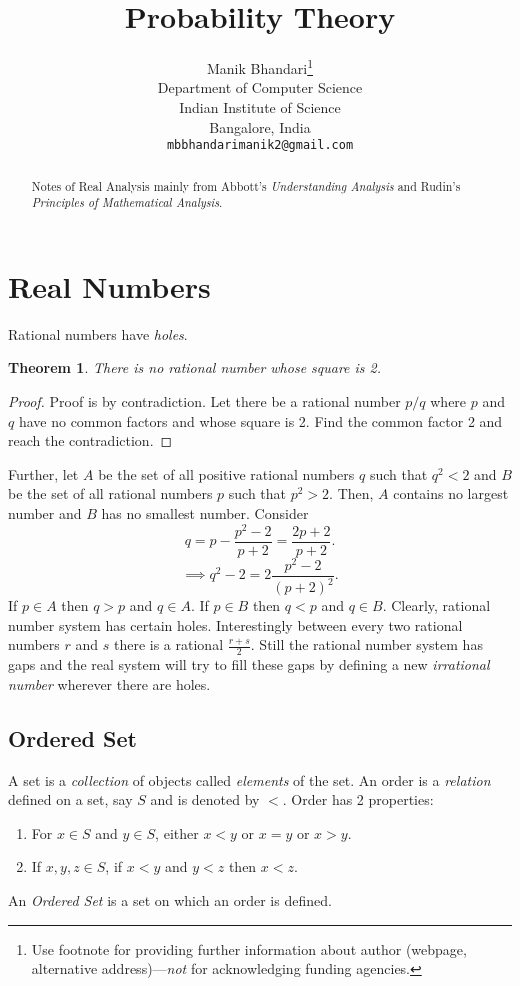 \documentclass{article}
\title{Probability Theory}
\author{
	Manik Bhandari\thanks{Use footnote for providing further
		information about author (webpage, alternative
		address)---\emph{not} for acknowledging funding agencies.} \\
	Department of Computer Science\\
	Indian Institute of Science\\
	Bangalore, India \\
	\texttt{mbbhandarimanik2@gmail.com} \\
}
\newtheorem{theorem}{Theorem}
\begin{document}
	
	\maketitle
	
	\begin{abstract}
		Notes of Real Analysis mainly from Abbott's \textit{Understanding Analysis} and Rudin's \textit{Principles of Mathematical Analysis}.
	\end{abstract}
	
	\section{Real Numbers}
	Rational numbers have \emph{holes}.
	\begin{theorem}
		There is no rational number whose square is 2.
	\end{theorem}
	\begin{proof}
		Proof is by contradiction. Let there be a rational number $p/q$ where $p$ and $q$ have no common factors and whose square is 2.
		Find the common factor 2 and reach the contradiction.
	\end{proof}
	Further, let $A$ be the set of all positive rational numbers $q$ such that $q^2 < 2$ and $B$ be the set of all rational numbers $p$ 
	such that $p^2 > 2$. Then, $A$ contains no largest number and $B$ has no smallest number. Consider 
	\[q = p - \frac{p^2-2}{p+2} = \frac{2p+2}{p+2}.\]  \[\implies q^2 - 2 = 2\frac{p^2-2}{(p+2)^2}.\]
	If $p \in A$ then $q > p$  and $q \in A$. If $p \in B$ then $q < p$ and $q \in B$.
	Clearly, rational number system has certain holes. Interestingly between every two rational numbers $r$ and $s$ there is a rational $\frac{r+s}{2}.$
	Still the rational number system has gaps and the real system will try to fill these gaps by defining a new \emph{irrational number} wherever there
	are holes.
	
	\subsection{Ordered Set}
	A set is a \emph{collection} of objects called \emph{elements} of the set. An order is a \emph{relation} defined on a set, say $S$ and is denoted
	by $<$. Order has 2 properties:
	\begin{enumerate}
		\item For $x \in S$ and $y \in S$, either $x < y$ or $x = y$ or $x > y$.
		\item If $x,y,z \in S$, if $x < y$ and $y < z$ then $x < z$.
	\end{enumerate}
	An \emph{Ordered Set} is a set on which an order is defined.
\end{document}
